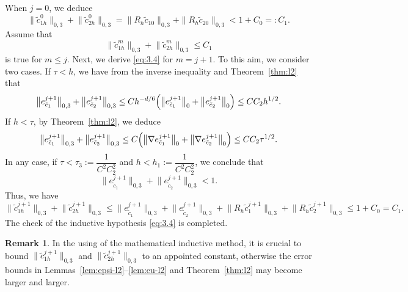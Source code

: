 \documentclass[a4paper,fleqn]{cas-sc}
\numberwithin{equation}{section}
\theoremstyle{definition}
\newtheorem{remark}[theorem]{Remark}
\begin{document}
When $j = 0$, we deduce
\begin{equation}\label{eq:4.37}
  \bigl\|\tilde{c}_{1h}^{0}\bigr\|_{0,3}
  + \bigl\|\tilde{c}_{2h}^{0}\bigr\|_{0,3}
  = \|R_{h}\tilde{c}_{10}\|_{0,3} + \|R_{h}\tilde{c}_{20}\|_{0,3}
  < 1 + C_{0} =: C_{1}.
\end{equation}
Assume that
\begin{equation}\label{eq:4.38}
  \bigl\|\tilde{c}_{1h}^{m}\bigr\|_{0,3}
  + \bigl\|\tilde{c}_{2h}^{m}\bigr\|_{0,3} \leq C_{1}
\end{equation}
is true for $m \leq j$. Next, we derive \eqref{eq:3.4} for $m = j+1$. To this aim, we
consider two cases. If $\tau < h$, we have from the inverse inequality and Theorem~\ref{thm:l2} that
\begin{equation}\label{eq:4.39}
  \bigl\|e_{\tilde{c}_{1}}^{j+1}\bigr\|_{0,3}
  + \bigl\|e_{\tilde{c}_{2}}^{j+1}\bigr\|_{0,3}
  \leq Ch^{-d/6}\Bigl(\bigl\|e_{\tilde{c}_{1}}^{j+1}\bigr\|_{0}
                     + \bigl\|e_{\tilde{c}_{2}}^{j+1}\bigr\|_{0}\Bigr)
  \leq CC_{2}h^{1/2}.
\end{equation}
If $h < \tau$, by Theorem~\ref{thm:l2}, we deduce
\begin{equation}\label{eq:4.40}
  \bigl\|e_{\tilde{c}_{1}}^{j+1}\bigr\|_{0,3}
  + \bigl\|e_{\tilde{c}_{2}}^{j+1}\bigr\|_{0,3}
  \leq C\Bigl(\bigl\|\nabla e_{\tilde{c}_{1}}^{j+1}\bigr\|_{0}
             + \bigl\|\nabla e_{\tilde{c}_{2}}^{j+1}\bigr\|_{0}\Bigr)
  \leq CC_{2}\tau^{1/2}.
\end{equation}
In any case, if $\tau < \tau_{3} := \dfrac{1}{C^{2}C_{2}^{2}}$ and
$h < h_{1} := \dfrac{1}{C^{2}C_{2}^{2}}$, we conclude that
\begin{equation}\label{eq:4.41}
  \bigl\|e_{\tilde{c}_{1}}^{j+1}\bigr\|_{0,3}
  + \bigl\|e_{\tilde{c}_{2}}^{j+1}\bigr\|_{0,3} < 1.
\end{equation}
Thus, we have
\begin{equation}\label{eq:4.42}
  \bigl\|\tilde{c}_{1h}^{j+1}\bigr\|_{0,3}
  + \bigl\|\tilde{c}_{2h}^{j+1}\bigr\|_{0,3}
  \leq \bigl\|e_{\tilde{c}_{1}}^{j+1}\bigr\|_{0,3}
     + \bigl\|e_{\tilde{c}_{2}}^{j+1}\bigr\|_{0,3}
     + \bigl\|R_{h}\tilde{c}_{1}^{j+1}\bigr\|_{0,3}
     + \bigl\|R_{h}\tilde{c}_{2}^{j+1}\bigr\|_{0,3}
  \leq 1 + C_{0} = C_{1}.
\end{equation}
The check of the inductive hypothesis \eqref{eq:3.4} is completed.

\begin{remark}\label{rem:inductive}
In the using of the mathematical inductive method, it is crucial to bound
$\|\tilde{c}_{1h}^{j+1}\|_{0,3}$ and $\|\tilde{c}_{2h}^{j+1}\|_{0,3}$ to an appointed
constant, otherwise the error bounds in Lemmas~\ref{lem:epsi-l2}--\ref{lem:eu-l2} and
Theorem~\ref{thm:l2} may become larger and larger.
\end{remark}
\end{document}
